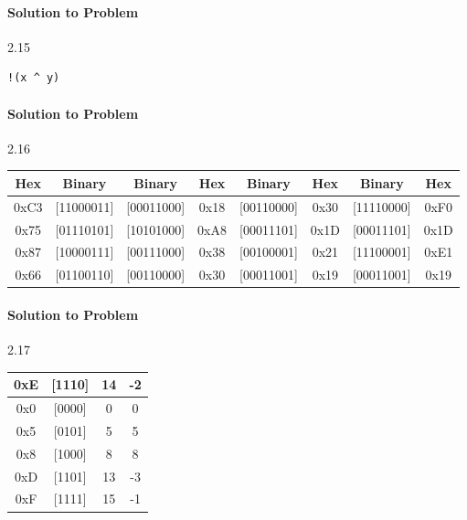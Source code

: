 \documentclass{report}
\begin{document}
\paragraph{Solution to Problem} 2.15 \\
\begin{lstlisting}
!(x ^ y)
\end{lstlisting}


\paragraph{Solution to Problem} 2.16 \\
\begin{center}
\begin{tabular}{ |c|c|c|c|c|c|c|c| }  
\hline
Hex & Binary & Binary & Hex & Binary & Hex & Binary & Hex  \\
\hline\hline
0xC3 & [11000011] &  [00011000] & 0x18 & [00110000] & 0x30 & [11110000] & 0xF0 \\
\hline
0x75 & [01110101] &  [10101000] & 0xA8 & [00011101] & 0x1D &[00011101] & 0x1D \\ 
\hline
0x87 & [10000111] &  [00111000] & 0x38 & [00100001] & 0x21 & [11100001] & 0xE1 \\
\hline
0x66 & [01100110] &  [00110000] & 0x30 & [00011001] & 0x19 & [00011001] & 0x19 \\
\hline
\end{tabular}
\end{center}

\paragraph{Solution to Problem} 2.17 \\

\begin{center}
\begin{tabular}{ |c|c|c|c| } 
\hline
0xE & [1110] & 14 & -2 \\
\hline
0x0 & [0000] & 0 & 0 \\
\hline
0x5 & [0101] & 5 & 5 \\
\hline
0x8 & [1000] & 8 & 8 \\
\hline
0xD & [1101] & 13 & -3 \\
\hline
0xF & [1111] & 15 & -1 \\
\hline
\end{tabular}
\end{center}
\end{document}
